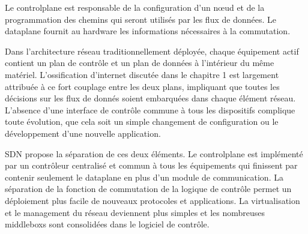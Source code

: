 
Le \gls{controlplane} est responsable de la configuration d'un nœud et de la programmation des chemins qui seront utilisés par les flux de données. Le \gls{dataplane} fournit au hardware les informations nécessaires à la commutation. \cite{ImplementationChallengesForSDNBackground}



Dans l'architecture réseau traditionnellement déployée, chaque équipement actif contient un plan de contrôle et un plan de données à l'intérieur du même matériel. L'ossification d'internet discutée dans le chapitre 1 est largement attribuée à ce fort couplage entre les deux plans, impliquant que toutes les décisions sur les flux de donnés soient embarquées dans chaque élément réseau. L'absence d'une interface de contrôle commune à tous les dispositifs complique toute évolution, que cela soit un simple changement de configuration ou le développement d'une nouvelle application. \cite{SurveySDNArchi}




SDN propose la séparation de ces deux éléments. Le \gls{controlplane} est implémenté par un contrôleur centralisé et commun à tous les équipements qui finissent par contenir seulement le \gls{dataplane} en plus d'un module de communication.  La séparation de la fonction de commutation de la logique de contrôle permet un déploiement plus facile de nouveaux protocoles et applications. La virtualisation et le management du réseau deviennent plus simples et les nombreuses \glspl{middlebox} sont consolidées dans le logiciel de contrôle. \cite{SurveySDNArchi} \cite{SDNNewNormONFExecutiveSummary}


